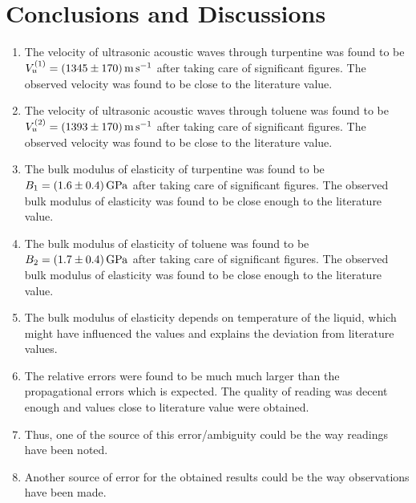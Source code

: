 \documentclass{article}
\begin{document}
\section{Conclusions and Discussions}
\begin{enumerate}
    \item The velocity of ultrasonic acoustic waves through turpentine was found to be $V_u^{(1)} = \SI[separate-uncertainty=true]{1345 \pm 170}{\metre \per \second}$ after taking care of significant figures. The observed velocity was found to be close to the literature value.
    \item The velocity of ultrasonic acoustic waves through toluene was found to be $V_u^{(2)} = \SI[separate-uncertainty=true]{1393 \pm 170}{\metre \per \second}$ after taking care of significant figures. The observed velocity was found to be close to the literature value.
    \item The bulk modulus of elasticity of turpentine was found to be \\ $B_1 = \SI[separate-uncertainty=true]{1.6 \pm 0.4}{\giga \pascal}$ after taking care of significant figures. The observed bulk modulus of elasticity was found to be close enough to the literature value. 
    \item The bulk modulus of elasticity of toluene was found to be \\
    $B_2 = \SI[separate-uncertainty=true]{1.7 \pm 0.4}{\giga \pascal}$ after taking care of significant figures. The observed bulk modulus of elasticity was found to be close enough to the literature value.
    \item The bulk modulus of elasticity depends on temperature of the liquid, which might have influenced the values and explains the deviation from literature values.
    \item The relative errors were found to be much much larger than the propagational errors which is expected. The quality of reading was decent enough and values close to literature value were obtained.
    \item Thus, one of the source of this error/ambiguity could be the way readings have been noted.
    \item Another source of error for the obtained results could be the way observations have been made.

\end{enumerate}
\end{document}
